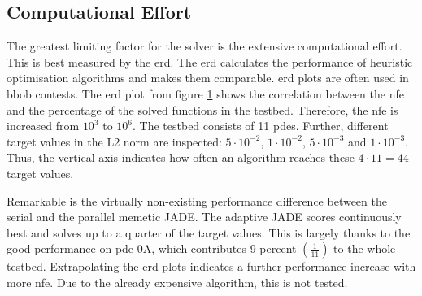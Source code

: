 \documentclass[./\jobname.tex]{subfiles}
\begin{document}
\subsection{Computational Effort}
\label{chap:computational_effort}
The greatest limiting factor for the solver is the extensive computational effort. This is best measured by the \gls{erd}. The \gls{erd} calculates the performance of heuristic optimisation algorithms and makes them comparable. \gls{erd} plots are often used in \gls{bbob} contests. The \gls{erd} plot from figure \ref{fig:ert_plot} shows the correlation between the \gls{nfe} and the percentage of the solved functions in the testbed. Therefore, the \gls{nfe} is increased from $10^3$ to $10^6$. The testbed consists of 11 \gls{pde}s. Further, different target values in the L2 norm are inspected: $5\cdot 10^{-2}$, $1\cdot 10^{-2}$, $5\cdot 10^{-3}$ and $1\cdot 10^{-3}$. Thus, the vertical axis indicates how often an algorithm reaches these $4 \cdot 11 = 44$ target values. 
\begin{figure}[h]
	\centering
	\noindent{}
	\label{fig:ert_plot}
\end{figure}
Remarkable is the virtually non-existing performance difference between the serial and the parallel memetic JADE. The adaptive JADE scores continuously best and solves up to a quarter of the target values. This is largely thanks to the good performance on \gls{pde} 0A, which contributes 9 percent $\left( \frac{1}{11} \right)$ to the whole testbed. Extrapolating the \gls{erd} plots indicates a further performance increase with more \gls{nfe}. Due to the already expensive algorithm, this is not tested. 
\end{document}
